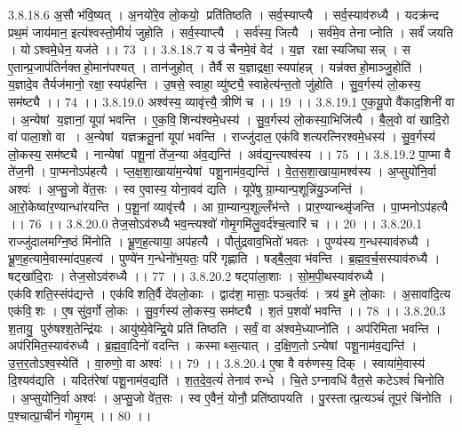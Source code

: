 3.8.18.6
अ॒सौ भ॑वि॒ष्यत् । अ॒नयो॑रे॒व लो॒कयो॒ प्रति॑तिष्ठति । सर्व॒स्याप्त्यै । सर्व॒स्याव॑रुध्यै । यदक्र॑न्द प्रथ॒मं जाय॑मान॒ इत्य॑श्वस्तो॒मीयं॑ जुहोति । सर्व॒स्याप्त्यै । सर्व॑स्य॒ जित्यै । सर्व॑मे॒व तेनाप्नोति । सर्वं॑ जयति । योऽश्वमे॒धेन॒ यज॑ते ।। 73 ।।
3.8.18.7
य उ॑ चैनमे॒वं वेद॑ । य॒ज्ञ रक्षा॑स्यजिघासन्न् । स ए॒तान्प्र॒जाप॑तिर्नक्तहो॒मान॑पश्यत् । तान॑जुहोत् । तैर्वै स य॒ज्ञाद्रक्षा॒॒स्यपा॑हन्न् । यन्न॑क्तहो॒माञ्जु॒होति॑ । य॒ज्ञादे॒व तैर्यज॑मानो॒ रक्षा॒॒स्यप॑हन्ति । उ॒षसे॒ स्वाहा॒ व्यु॑ष्ट्यै॒ स्वाहेत्य॑न्त॒तो जु॑होति । सु॒व॒र्गस्य॑ लो॒कस्य॒ सम॑ष्ट्यै ।। 74 ।।
3.8.19.0
अश्व॑स्य॒ व्यावृ॑त्त्यै॒ त्रीणि॑ च ।। 19 ।।
3.8.19.1
ए॒क॒यू॒पो वै॑काद॒शिनी॑ वा । अ॒न्येषां य॒ज्ञानां॒ यूपा॑ भवन्ति । ए॒क॒वि॒॒शिन्य॑श्वमे॒धस्य॑ । सु॒व॒र्गस्य॑ लो॒कस्या॒भिजि॑त्यै । बै॒ल्॒वो वा॑ खादि॒रो वा॑ पाला॒शो वा । अ॒न्येषां यज्ञक्रतू॒नां यूपा॑ भवन्ति । राज्जु॑दाल॒ एक॑विशत्यरत्निरश्वमे॒धस्य॑ । सु॒व॒र्गस्य॑ लो॒कस्य॒ सम॑ष्ट्यै । नान्येषां पशू॒नां ते॑ज॒न्या अ॑व॒द्यन्ति॑ । अव॑द्य॒न्त्यश्व॑स्य ।। 75 ।।
3.8.19.2
पा॒प्मा वै ते॑ज॒नी । पा॒प्मनोऽप॑हत्यै । प्ल॒क्ष॒शा॒खाया॑म॒न्येषां पशू॒नाम॑व॒द्यन्ति॑ । वे॒त॒स॒शा॒खाया॒मश्व॑स्य । अ॒प्सुयो॑नि॒र्वा अश्वः॑ । अ॒प्सु॒जो वे॑त॒सः । स्व ए॒वास्य॒ योना॒वव॑ द्यति । यूपे॑षु ग्रा॒म्यान्प॒शून्नि॑यु॒ञ्जन्ति॑ । आ॒रो॒केष्वा॑र॒ण्यान्धा॑रयन्ति । प॒शू॒नां व्यावृ॑त्त्यै । आ ग्रा॒म्यान्प॒शूल्लँभ॑न्ते । प्रार॒ण्यान्थ्सृ॑जन्ति । पा॒प्मनोऽप॑हत्यै ।। 76 ।।
3.8.20.0
तेज॒सोऽव॑रुध्यै भव॒न्त्यश्वो॑ गोमृ॒गमि॑लु॒वर्द॑श्च॒त्वारि॑ च ।। 20 ।।
3.8.20.1
राज्जु॑दालमग्नि॒ष्ठं मि॑नोति । भ्रू॒ण॒ह॒त्याया॒ अप॑हत्यै । पौतु॑द्रवाव॒भितो॑ भवतः । पुण्य॑स्य ग॒न्धस्याव॑रुध्यै । भ्रू॒ण॒ह॒त्यामे॒वास्मा॑दप॒हत्य॑ । पुण्ये॑न ग॒न्धेनो॑भ॒यतः॒ परि॑ गृह्णाति । षड्बै॒ल्॒वा भ॑वन्ति । ब्र॒ह्म॒व॒र्च॒सस्याव॑रुध्यै । षट्खा॑दि॒राः । तेज॒सोऽव॑रुध्यै ।। 77 ।।
3.8.20.2
षट्पा॑ला॒शाः । सो॒म॒पी॒थस्याव॑रुध्यै । एक॑विशति॒स्संप॑द्यन्ते । एक॑विशति॒र्वै दे॑वलो॒काः । द्वाद॑श॒ मासाः॒ पञ्च॒र्तवः॑ । त्रय॑ इ॒मे लो॒काः । अ॒सावा॑दि॒त्य एक॑वि॒॒शः । ए॒ष सु॑व॒र्गो लो॒कः । सु॒व॒र्गस्य॑ लो॒कस्य॒ सम॑ष्ट्यै । श॒तं प॒शवो॑ भवन्ति ।। 78 ।।
3.8.20.3
श॒तायु॒ पुरु॑षश्श॒तेन्द्रि॑यः । आयु॑ष्ये॒वेन्द्रि॒ये प्रति॑ तिष्ठति । सर्वं॒ वा अ॑श्वमे॒ध्याप्नो॑ति । अप॑रिमिता भवन्ति । अप॑रिमित॒स्याव॑रुध्यै । ब्र॒ह्म॒वा॒दिनो॑ वदन्ति । कस्माथ्स॒त्यात् । द॒क्षि॒ण॒तोऽन्येषां पशू॒नाम॑व॒द्यन्ति॑ । उ॒त्त॒र॒तोऽश्व॒स्येति॑ । वा॒रुणो॒ वा अश्वः॑ ।। 79 ।।
3.8.20.4
ए॒षा वै वरु॑णस्य॒ दिक् । स्वाया॑मे॒वास्य॑ दि॒श्यव॑द्यति । यदित॑रेषां पशू॒नाम॑व॒द्यति॑ । श॒त॒दे॒व॒त्यं॑ तेनाव॑ रुन्धे । चि॒तेऽग्नावधि॑ वैत॒से कटेऽश्वं॑ चिनोति । अ॒प्सुयो॑नि॒र्वा अश्वः॑ । अ॒प्सु॒जो वे॑त॒सः । स्व ए॒वैनं॒ योनौ॒ प्रति॑ष्ठापयति । पु॒रस्तात्प्र॒त्यञ्चं॑ तूप॒रं चि॑नोति । प॒श्चात्प्रा॒चीनं॑ गोमृ॒गम् ।। 80 ।।
